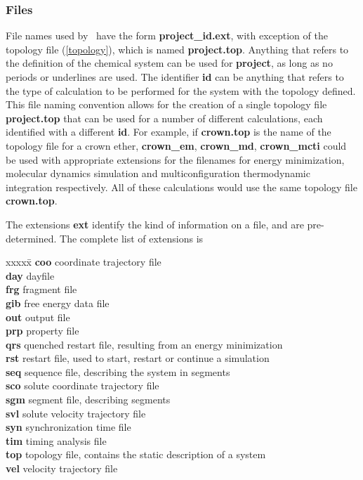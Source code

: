 \subsubsection{Files}
\label{filenames}
\par
File names used by \nwargos\ have the form {\bf project\_id.ext}, with
exception of the topology file (\ref{topology}), which is named 
{\bf project.top}.
Anything that refers to the definition of the chemical system can be used
for {\bf project}, as long as no periods or underlines are used.
The identifier {\bf id} can be anything that refers to the type of 
calculation to be performed for the system with the topology defined.
This file naming convention allows for the creation of a single
topology file {\bf project.top} that can be used for a number of 
different calculations, each identified with a different {\bf id}.
For example, if {\bf crown.top} is the name of the topology file for
a crown ether, {\bf crown\_em}, {\bf crown\_md}, {\bf crown\_mcti} could
be used with appropriate extensions for the filenames for energy
minimization, molecular dynamics simulation and multiconfiguration
thermodynamic integration respectively. All of these calculations
would use the same topology file {\bf crown.top}.
\par
\label{extensions}
\par
The extensions {\bf ext} identify the kind of information on a file,
and are pre-determined. 
The complete list of extensions is
\begin{tabbing}
xxxxx\=\kill
{\bf coo} \> coordinate trajectory file\\
{\bf day} \> dayfile\\
{\bf frg} \> fragment file\\
{\bf gib} \> free energy data file\\
{\bf out} \> output file\\
{\bf prp} \> property file\\
{\bf qrs} \> quenched restart file, resulting from an energy minimization\\
{\bf rst} \> restart file, used to start, restart or continue a simulation \\
{\bf seq} \> sequence file, describing the system in segments\\
{\bf sco} \> solute coordinate trajectory file\\
{\bf sgm} \> segment file, describing segments\\
{\bf svl} \> solute velocity trajectory file\\
{\bf syn} \> synchronization time file\\
{\bf tim} \> timing analysis file\\
{\bf top} \> topology file, contains the static description of a system\\
{\bf vel} \> velocity trajectory file\\
\end{tabbing}
